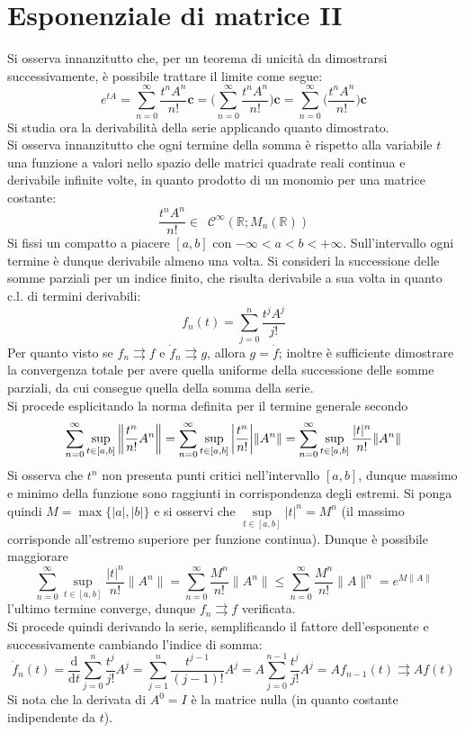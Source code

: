 \documentclass[10pt, oneside]{book}
\theoremstyle{plain}
\begin{document}
\section{Esponenziale di matrice II}
Si osserva innanzitutto che, per un teorema di unicità da dimostrarsi successivamente, è possibile trattare il limite come segue:
\[e^{tA} = \sum\limits_{n=0}^\infty \frac{t^n A^n}{n!} \mathbf{c} = \bigg(\sum\limits_{n=0}^\infty \frac{t^n A^n}{n!}\bigg) \mathbf{c} = \sum\limits_{n=0}^\infty \bigg(\frac{t^n A^n}{n!}\bigg) \mathbf{c}\]
Si studia ora la derivabilità della serie applicando quanto dimostrato.
\\Si osserva innanzitutto che ogni termine della somma è rispetto alla variabile $t$ una funzione a valori nello spazio delle matrici quadrate reali continua e derivabile infinite volte, in quanto prodotto di un monomio per una matrice costante:
\[\frac{t^n A^n}{n!} \in \enspace \mathcal{C}^{\infty}(\mathbb{R} ; M_n(\mathbb{R}))\]
Si fissi un compatto a piacere $[a,b]$ con $- \infty < a < b < + \infty$. Sull'intervallo ogni termine è dunque derivabile almeno una volta. Si consideri la successione delle somme parziali per un indice finito, che risulta derivabile a sua volta in quanto c.l. di termini derivabili:
\[f_n(t) = \sum\limits_{j=0}^n \frac{t^j A^j}{j!}\]
Per quanto visto se $f_n \rightrightarrows f$ e $\dot{f}_n \rightrightarrows g$, allora $g = \dot{f}$; inoltre è sufficiente dimostrare la convergenza totale per avere quella uniforme della successione delle somme parziali, da cui consegue quella della somma della serie. 
\\Si procede esplicitando la norma definita per il termine generale secondo
\[\sum\limits_{n=0}^\infty \sup\limits_{t \in [a,b]}\bigg{\|}\frac{t^n}{n!}A^n\bigg{\|} = \sum\limits_{n=0}^\infty \sup\limits_{t \in [a,b]}\bigg{|}\frac{t^n}{n!}\bigg| \|A^n\| = \sum\limits_{n=0}^\infty \sup\limits_{t \in [a,b]}\frac{|t|^n}{n!}\|A^n\|\]
Si osserva che $t^n$ non presenta punti critici nell'intervallo $[a,b]$, dunque massimo e minimo della funzione sono raggiunti in corrispondenza degli estremi. Si ponga quindi $M = \max\{|a|, |b|\}$ e si osservi che $\displaystyle \sup\limits_{t \in[a,b]}|t|^n = M^n$ (il massimo corrisponde all'estremo superiore per funzione continua). Dunque è possibile maggiorare 
\[\sum\limits_{n=0}^\infty \sup\limits_{t \in [a,b]}\frac{|t|^n}{n!}\|A^n\| = \sum\limits_{n=0}^\infty \frac{M^n}{n!}\|A^n\| \leq \sum\limits_{n=0}^\infty \frac{M^n}{n!}\|A\|^n = e^{\displaystyle M \|A\|}\]
l'ultimo termine converge, dunque $f_n \rightrightarrows f$ verificata.
\\Si procede quindi derivando la serie, semplificando il fattore dell'esponente e successivamente cambiando l'indice di somma:
\[\dot{f}_n(t) = \frac{\textrm{d}}{\textrm{d}t} \sum\limits_{j=0}^n \frac{t^j}{j!}A^j = \sum\limits_{j=1}^n \frac{t^{j-1}}{(j-1)!}A^j = A \sum\limits_{j=0}^{n-1} \frac{t^j}{j!}A^j = A f_{n-1}(t) \rightrightarrows Af(t)\]
Si nota che la derivata di $A^0 = I$ è la matrice nulla (in quanto costante indipendente da $t$).
\end{document}
